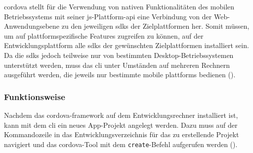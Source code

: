 
\gls{cordova} stellt für die Verwendung von nativen Funktionalitäten des mobilen Betriebssystems mit seiner \gls{js}-Plattform-\gls{api} eine Verbindung von der Web-Anwendungsebene zu den jeweiligen \glspl{sdk} der Zielplattformen her.
Somit müssen, um auf plattformspezifische Features zugreifen zu können, auf der Entwicklungsplattform alle \glspl{sdk} der gewünschten Zielplattformen installiert sein.
Da die \glspl{sdk} jedoch teilweise nur von bestimmten Desktop-Betriebssystemen unterstützt werden, muss das \gls{cli} unter Umständen auf mehreren Rechnern ausgeführt werden, die jeweils nur bestimmte mobile \glspl{plattform} bedienen ().

\subsubsection{Funktionsweise}

Nachdem das \gls{cordova}-\gls{framework} auf dem Entwicklungsrechner installiert ist, kann mit dem \gls{cli} ein neues App-Projekt angelegt werden. 
Dazu muss auf der Kommandozeile in das Entwicklungsverzeichnis für das zu erstellende Projekt navigiert und das \gls{cordova}-Tool mit dem \lstinline|create|-Befehl aufgerufen werden ().


